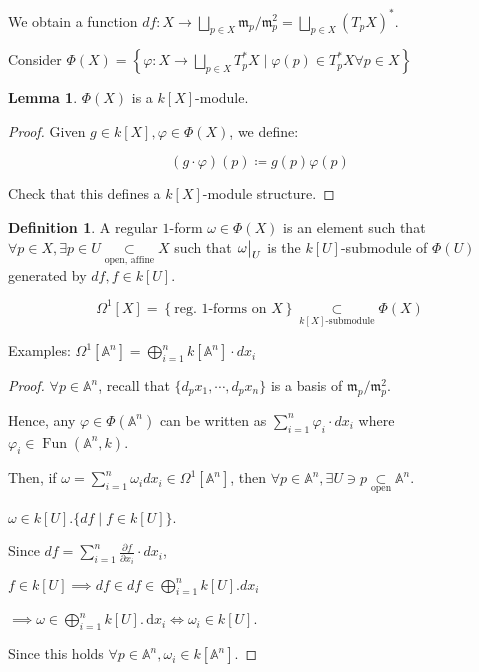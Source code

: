 \documentclass{article}
\theoremstyle{definition}
\newtheorem*{definition}{Definition}
\newtheorem{lemma}[theorem]{Lemma}
\begin{document}
    We obtain a function \(df: X \to \bigsqcup_{p\in X} \mathfrak{m}_p / \mathfrak{m}_p^2 = \bigsqcup_{p\in X} (T_p X)^{\ast}\).

    Consider \(\Phi(X) = \left\{ \varphi : X \to \bigsqcup_{p\in X} T_p^{\ast} X \mid \varphi (p) \in T_p^{\ast} X \forall p\in X \right\}\)

    \begin{lemma}
        \(\Phi(X)\) is a \(k[X]\)-module.
    \end{lemma}

    \begin{proof}
        Given \(g\in k[X], \varphi \in \Phi(X)\), we define:

        \[
            (g \cdot \varphi)(p) \coloneqq g(p) \varphi(p)
        \]

        Check that this defines a \(k[X]\)-module structure.
    \end{proof}

    \begin{definition}
        A regular \(1\)-form \(\omega\in \Phi (X)\) is an element such that \(\forall p\in X, \exists p\in U \underset{\text{open, affine}}{\subset} X\) such that \(\eval{\omega}_U\) is the \(k[U]\)-submodule of \(\Phi(U)\) generated by \(df, f\in k[U]\).   

        \[
            \Omega^1[X] = \left\{ \text{reg. \(1\)-forms on \(X\)} \right\} \underset{\text{\(k[X]\)-submodule}}{\subset} \Phi(X) 
        \]
    \end{definition}

    Examples: \(\Omega^1[\mathbb{A}^n] = \bigoplus_{i=1}^n k[\mathbb{A}^n] \cdot dx_i\) 

    \begin{proof}
        
        \(\forall p\in \mathbb{A}^n\), recall that \(\{ d_p x_1, \cdots , d_p x_n \}\) is a basis of \(\mathfrak{m}_p / \mathfrak{m}_p^2\).

        Hence, any \(\varphi \in \Phi(\mathbb{A}^n)\) can be written as \(\sum_{i=1}^n \varphi_i \cdot dx_i\) where \(\varphi_i \in \operatorname{Fun}(\mathbb{A}^n, k)\).

        Then, if \(\omega = \sum_{i=1}^n \omega_i d x_i \in \Omega^1[\mathbb{A}^n]\), then \(\forall p\in \mathbb{A}^n, \exists U \ni p \underset{\text{open}}{\subset} \mathbb{A}^n\).

        \(\omega \in k[U] . \{ df \mid f \in k[U] \} \).

        Since \(df = \sum_{i=1}^n \frac{\partial f}{\partial x_i} \cdot d x_i\),

        \(f \in k[U] \implies df \in df \in \bigoplus_{i=1}^n k[U] . d x_i\) 

        \(\implies \omega \in \bigoplus_{i=1}^n k[U] . \, \mathrm{d}x _i \iff \omega_i \in k[U]\).

        Since this holds \(\forall p\in \mathbb{A}^n, \omega_i \in k[\mathbb{A}^n]\).

    \end{proof}
\end{document}
